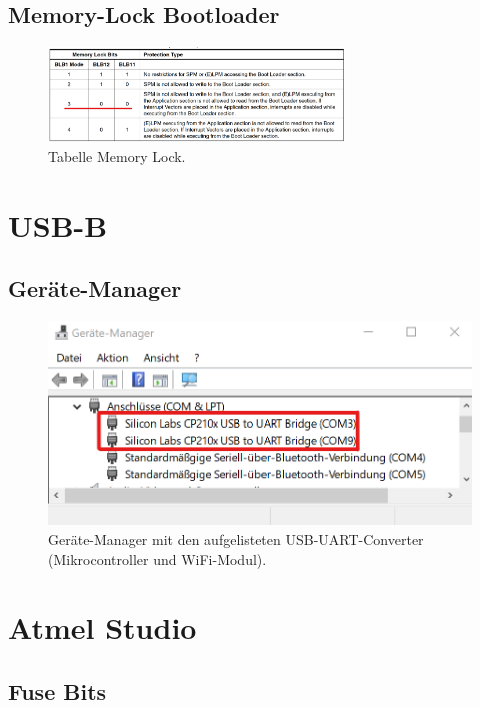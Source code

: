 \begin{appendix}

\subsection{Memory-Lock Bootloader}

\begin{figure}[h!]
	\centering
	\includegraphics[width=0.7\textwidth]{graphics/Tabelle_Memory_Lock}
	\caption{Tabelle Memory Lock.}
	\label{fig:Tabelle_Memory_Lock}
\end{figure}


\newpage
\section{USB-B}\label{Appendix:USB_B}

\subsection{Geräte-Manager}

\begin{figure}[h!]
\center
\includegraphics[width = 0.6 \textwidth]{graphics/USB_Devices_Ger_Man}
\caption{Geräte-Manager mit den aufgelisteten USB-UART-Converter (Mikrocontroller und WiFi-Modul).}
\label{fig:USB_Devices_Ger_Man}
\end{figure}

\section{Atmel Studio}\label{Appendix:Atmel_Studio}

\subsection{Fuse Bits}


\end{appendix}
